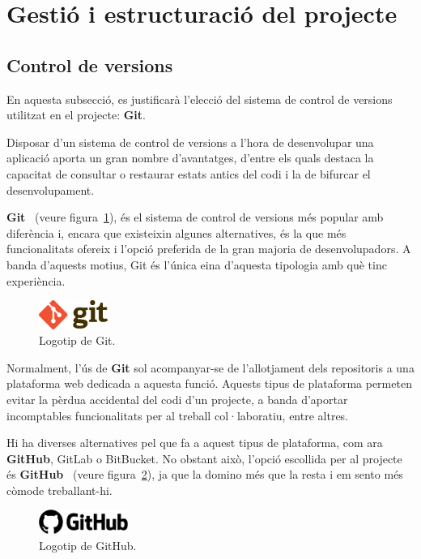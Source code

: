 \documentclass[a4paper,12pt]{ThesisStyle}
\begin{document}
\section{Gestió i estructuració del projecte}
\label{sec:decisions_estructura}

\subsection{Control de versions}
\label{subsec:decisions_estructura_versions}

En aquesta subsecció, es justificarà l'elecció del sistema de control de versions utilitzat en el projecte: \textbf{Git}.

Disposar d'un sistema de control de versions a l'hora de desenvolupar una aplicació aporta un gran nombre d'avantatges, d'entre els quals destaca la capacitat de consultar o restaurar estats antics del codi i la de bifurcar el desenvolupament.

\textbf{Git}~\cite{Git} (veure figura~\ref{img:logo_git}), és el sistema de control de versions més popular amb diferència i, encara que existeixin algunes alternatives, és la que més funcionalitats ofereix i l'opció preferida de la gran majoria de desenvolupadors. A banda d'aquests motius, Git és l'única eina d'aquesta tipologia amb què tinc experiència. 

\begin{figure}[H]
  \centering
  \includegraphics[width=0.2\textwidth]{assets/logos/Git.png}
  \caption{\label{img:logo_git}Logotip de Git.}
\end{figure}

Normalment, l'ús de \textbf{Git} sol acompanyar-se de l'allotjament dels repositoris a una plataforma web dedicada a aquesta funció. Aquests tipus de plataforma permeten evitar la pèrdua accidental del codi d'un projecte, a banda d'aportar incomptables funcionalitats per al treball col·laboratiu, entre altres.

Hi ha diverses alternatives pel que fa a aquest tipus de plataforma, com ara \textbf{GitHub}, GitLab o BitBucket. No obstant això, l'opció escollida per al projecte és \textbf{GitHub}~\cite{GitHub} (veure figura~\ref{img:logo_github}), ja que la domino més que la resta i em sento més còmode treballant-hi.

\begin{figure}[H]
  \centering
  \includegraphics[width=0.26\textwidth]{assets/logos/GitHub.png}
  \caption{\label{img:logo_github}Logotip de GitHub.}
\end{figure}
\end{document}
